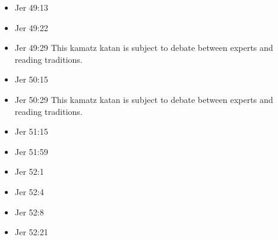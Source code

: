 \documentclass[14pt]{book}
\begin{document}
\begin{multicols}{2}
\begin{itemize}
								\item Jer 49:13
								
								\item Jer 49:22
								
								\item Jer 49:29 This kamatz katan is subject to debate between experts and reading traditions.
								
								\item Jer 50:15
								
								\item Jer 50:29 This kamatz katan is subject to debate between experts and reading traditions.
								
								\item Jer 51:15
								
								\item Jer 51:59
								
								\item Jer 52:1
								
								\item Jer 52:4
								
								\item Jer 52:8
								
								\item Jer 52:21
								
							\end{itemize}\end{multicols}
\end{document}
